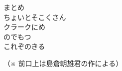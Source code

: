 \documentclass[10pt,b5j]{tarticle} %
\begin{document}
\begin{enumerate}
\begin{minipage}[c]{\blocksize}
    \end{minipage}
    \begin{minipage}[c]{\blocksize}

        \vspace{\linespace}
        \item [まとめ]~\\
        ちょいとそこくさん\\
        クラークにめ\\
        のでもつ\\
        これぞのきる
    
    \end{minipage}
\end{enumerate} %

\begin{flushright}
    （※ 前口上は島倉朝雄君の作による）
\end{flushright}

\end{document}
